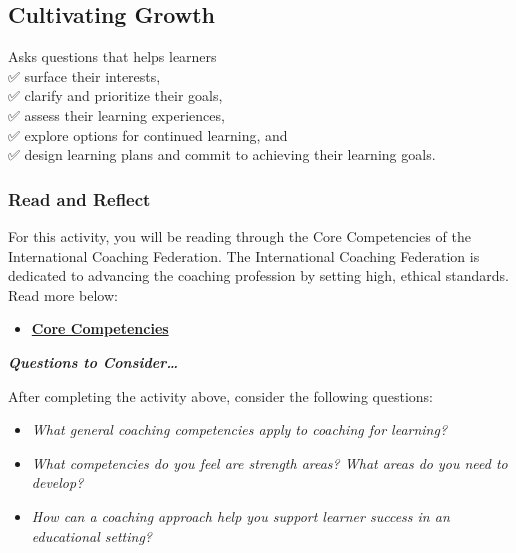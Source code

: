 \documentclass[
]{book}
\providecommand{\tightlist}{%
  \setlength{\itemsep}{0pt}\setlength{\parskip}{0pt}}
\begin{document}
\hypertarget{cultivating-growth}{%
\subsection*{Cultivating Growth}\label{cultivating-growth}}

Asks questions that helps learners\\
✅ surface their interests,\\
✅ clarify and prioritize their goals,\\
✅ assess their learning experiences,\\
✅ explore options for continued learning, and\\
✅ design learning plans and commit to achieving their learning goals.

\begin{reflect}
\hypertarget{read-and-reflect-3}{%
\subsubsection*{Read and Reflect}\label{read-and-reflect-3}}

For this activity, you will be reading through the Core Competencies of the International Coaching Federation. The International Coaching Federation is dedicated to advancing the coaching profession by setting high, ethical standards. Read more below:

\begin{itemize}
\tightlist
\item
  \href{https://coachfederation.org/core-competencies}{\textbf{Core Competencies}}
\end{itemize}

\textbf{\emph{Questions to Consider\ldots{}}}

After completing the activity above, consider the following questions:

\begin{itemize}
\tightlist
\item
  \emph{What general coaching competencies apply to coaching for learning?}
\item
  \emph{What competencies do you feel are strength areas? What areas do you need to develop?}
\item
  \emph{How can a coaching approach help you support learner success in an educational setting?}
\end{itemize}
\end{reflect}
\end{document}
